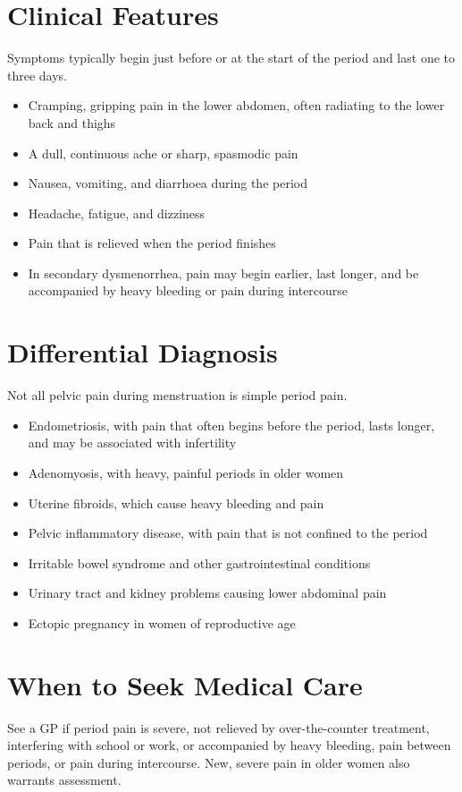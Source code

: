 \section*{Clinical Features}
Symptoms typically begin just before or at the start of the period and last one to three days.
\begin{itemize}
    \item Cramping, gripping pain in the lower abdomen, often radiating to the lower back and thighs
    \item A dull, continuous ache or sharp, spasmodic pain
    \item Nausea, vomiting, and diarrhoea during the period
    \item Headache, fatigue, and dizziness
    \item Pain that is relieved when the period finishes
    \item In secondary dysmenorrhea, pain may begin earlier, last longer, and be accompanied by heavy bleeding or pain during intercourse
\end{itemize}

\section*{Differential Diagnosis}
Not all pelvic pain during menstruation is simple period pain.
\begin{itemize}
    \item Endometriosis, with pain that often begins before the period, lasts longer, and may be associated with infertility
    \item Adenomyosis, with heavy, painful periods in older women
    \item Uterine fibroids, which cause heavy bleeding and pain
    \item Pelvic inflammatory disease, with pain that is not confined to the period
    \item Irritable bowel syndrome and other gastrointestinal conditions
    \item Urinary tract and kidney problems causing lower abdominal pain
    \item Ectopic pregnancy in women of reproductive age
\end{itemize}

\section*{When to Seek Medical Care}
See a GP if period pain is severe, not relieved by over-the-counter treatment, interfering with school or work, or accompanied by heavy bleeding, pain between periods, or pain during intercourse. New, severe pain in older women also warrants assessment.

